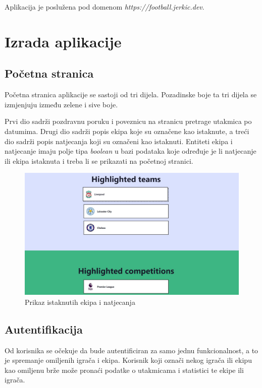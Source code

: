\documentclass[times, utf8, zavrsni]{fer}
\begin{document}
Aplikacija je poslužena pod domenom \emph{https://football.jerkic.dev}.

\chapter{Izrada aplikacije}

\section{Početna stranica}

Početna stranica aplikacije se sastoji od tri dijela. Pozadinske boje ta tri dijela se izmjenjuju između zelene i sive boje.

Prvi dio sadrži pozdravnu poruku i poveznicu na stranicu pretrage utakmica po datumima. Drugi dio sadrži popis ekipa koje su označene kao istaknute, a treći dio sadrži popis natjecanja koji su označeni kao istaknuti.
Entiteti ekipa i natjecanje imaju polje tipa \emph{boolean} u bazi podataka koje određuje je li natjecanje ili ekipa istaknuta i treba li se prikazati na početnoj stranici.

\begin{figure}[htb]
\centering
\includegraphics[width=14cm]{images/hero.jpg}
\caption{Prikaz istaknutih ekipa i natjecanja}
\label{fig:hero}
\end{figure}


\section{Autentifikacija}

Od korisnika se očekuje da bude autentificiran za samo jednu funkcionalnost, a to je spremanje omiljenih igrača i ekipa.
Korisnik koji označi nekog igrača ili ekipu kao omiljenu brže može pronaći podatke o utakmicama i statistici te ekipe ili igrača.
\end{document}
